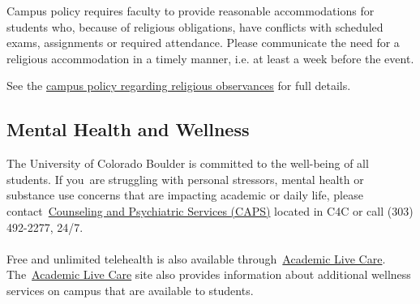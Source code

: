 Campus policy requires faculty to provide reasonable accommodations for
students who, because of religious obligations, have conflicts with
scheduled exams, assignments or required attendance. Please communicate
the need for a religious accommodation in a timely manner, i.e. at least a week before the event. 

See the
\href{http://www.colorado.edu/policies/observance-religious-holidays-and-absences-classes-andor-exams}{{campus
policy regarding religious observances}} for full details.

\subsection*{Mental Health and Wellness}

The University of Colorado Boulder is committed to the well-being of all
students. If you~are struggling with personal stressors, mental health
or substance use concerns that are impacting academic or daily life,
please contact~\href{https://www.colorado.edu/counseling/}{{Counseling
and Psychiatric Services (CAPS)}} located in C4C or call (303) 492-2277,
24/7.~\\
~\\
Free and unlimited telehealth is also available
through~\href{https://www.colorado.edu/health/academiclivecare}{{Academic
Live Care}}.
The~\href{https://www.colorado.edu/health/academiclivecare}{Academic
Live Care} site also provides information about additional wellness
services on campus that are available to students.
